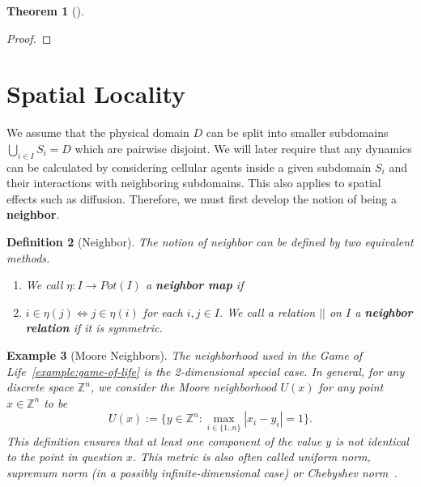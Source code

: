 \documentclass{article}
\newtheorem{definition}{Definition}[section]
\newtheorem{example}[definition]{Example}
\newtheorem{theorem}[definition]{Theorem}
\begin{document}
\begin{theorem}[]
\end{theorem}
\begin{proof}
\end{proof}

\section{Spatial Locality}
\label{section:spatial-decomposition}
We assume that the physical domain $D$ can be split into smaller subdomains
$\bigcup_{i\in I}S_i=D$ which are pairwise disjoint.
We will later require that any dynamics can be calculated by considering cellular agents inside a
given subdomain $S_i$ and their interactions with neighboring subdomains.
This also applies to spatial effects such as diffusion.
Therefore, we must first develop the notion of being a \textbf{neighbor}.

\begin{definition}[Neighbor]
    The notion of neighbor can be defined by two equivalent methods.
    \begin{enumerate}
        \item We call $\eta:I\rightarrow Pot(I)$ a \textbf{neighbor map} if
        \item $i\in\eta(j) \Leftrightarrow j\in\eta(i)$ for each $i,j\in I$.
            We call a relation $||$ on $I$ a \textbf{neighbor relation} if it is symmetric.
    \end{enumerate}
\end{definition}

\begin{example}[Moore Neighbors]
    The neighborhood used in the Game of Life~\ref{example:game-of-life} is the 2-dimensional
    special case.
    In general, for any discrete space $\mathbb{Z}^n$, we consider the Moore neighborhood $U(x)$ for
    any point $x\in\mathbb{Z}^n$ to be
    \begin{equation}
        U(x) := \{y\in\mathbb{Z}^n:\max\limits_{i\in\{1..n\}}|x_i-y_i|=1\}.
    \end{equation}
    This definition ensures that at least one component of the value $y$ is not identical to the
    point in question $x$.
    This metric is also often called uniform norm, supremum norm (in a possibly infinite-dimensional
    case) or Chebyshev norm~\cite{Rudin1976}.
\end{example}
\end{document}

